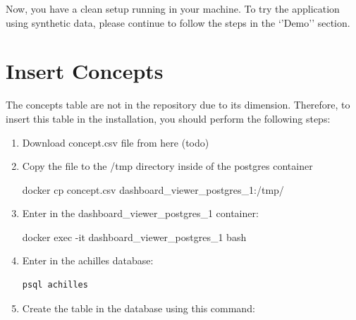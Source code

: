 \documentclass[]{book}
\newenvironment{Shaded}{\begin{snugshade}}{\end{snugshade}}
\newcommand{\ExtensionTok}[1]{#1}
\newcommand{\NormalTok}[1]{#1}
\begin{document}
Now, you have a clean setup running in your machine. To try the
application using synthetic data, please continue to follow the steps in
the `'Demo'' section.

\section{Insert Concepts}\label{insert-concepts}

The concepts table are not in the repository due to its dimension.
Therefore, to insert this table in the installation, you should perform
the following steps:

\begin{enumerate}
\def\labelenumi{\arabic{enumi}.}
\item
  Download concept.csv file from here (todo)
\item
  Copy the file to the /tmp directory inside of the postgres container

\begin{Shaded}
\begin{Highlighting}[]
\ExtensionTok{docker}\NormalTok{ cp concept.csv dashboard_viewer_postgres_1:/tmp/}
\end{Highlighting}
\end{Shaded}
\item
  Enter in the dashboard\_viewer\_postgres\_1 container:

\begin{Shaded}
\begin{Highlighting}[]
\ExtensionTok{docker}\NormalTok{ exec -it dashboard_viewer_postgres_1 bash}
\end{Highlighting}
\end{Shaded}
\item
  Enter in the achilles database:

\begin{verbatim}
psql achilles
\end{verbatim}
\item
  Create the table in the database using this command:


\end{enumerate}
\end{document}
